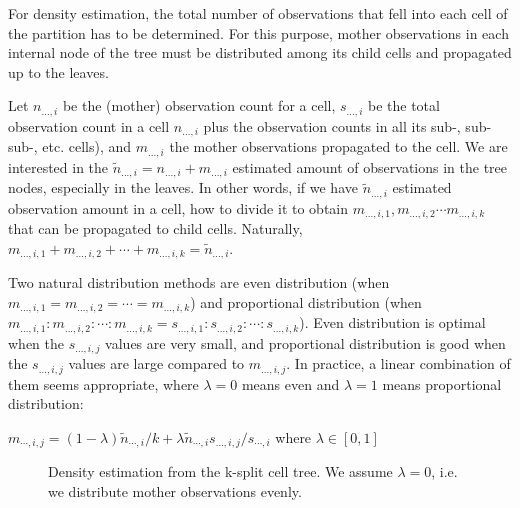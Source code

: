 For density estimation, the total number of observations that
fell into each cell of the partition has to be determined. For
this purpose, mother observations in each internal node of the
tree must be distributed among its child cells and propagated
up to the leaves.


Let $n_{...,i}$ be the (mother) observation count for a cell,
$s_{...,i}$ be the total observation count in a cell $n_{...,i}$ plus
the observation counts in all its sub-, sub-sub-, etc. cells), and
$m_{...,i}$ the mother observations propagated to the cell. We are
interested in the $\tilde{n}_{...,i} = n_{...,i} + m_{...,i}$
estimated amount of observations in the tree nodes, especially in the
leaves. In other words, if we have $\tilde{n}_{...,i}$ estimated
observation amount in a cell, how to divide it to obtain
$m_{...,i,1}, m_{...,i,2} \cdots m_{...,i,k}$
that can be propagated to child cells. Naturally,
$m_{...,i,1} + m_{...,i,2} + \cdots + m_{...,i,k} = \tilde{n}_{...,i}$.


Two natural distribution methods are even
distribution (when
$m_{...,i,1} = m_{...,i,2} = \cdots = m_{...,i,k}$) and proportional
distribution (when
$m_{...,i,1} : m_{...,i,2} : \cdots : m_{...,i,k} = s_{...,i,1} : s_{...,i,2} : \cdots : s_{...,i,k}$).
Even distribution is optimal when the
$s_{...,i,j}$ values are very small, and proportional distribution is
good when the $s_{...,i,j}$ values are large compared to
$m_{...,i,j}$. In practice, a linear combination of them seems
appropriate, where $\lambda=0$ means even and $\lambda=1$ means
proportional distribution:


$m_{\cdots,i,j} = (1-\lambda)\tilde{n}_{\cdots,i}/k + \lambda \tilde{n}_{\cdots,i} s_{...,i,j} / s_{\cdots,i}$
where $\lambda\in[0,1]$

\begin{figure}[htbp]
  \begin{center}
    
    \caption{Density estimation from the k-split cell tree. We
      assume $\lambda=0$, i.e. we distribute mother observations
      evenly.}
  \end{center}
\end{figure}

